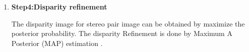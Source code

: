 \begin{enumerate}
\item \textbf{Step4:Disparity refinement}

The  disparity image for stereo pair image can be obtained by maximize the posterior probability. The disparity Refinement is done by Maximum A Posterior (MAP) estimation .





\end{enumerate}
